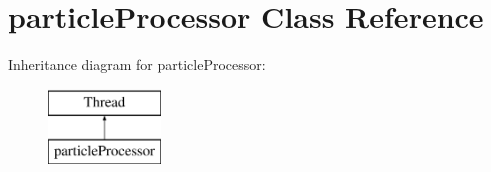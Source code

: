 \hypertarget{classparticleProcessor}{}\section{particle\+Processor Class Reference}
\label{classparticleProcessor}
Inheritance diagram for particle\+Processor\+:\begin{figure}[H]
\begin{center}
\leavevmode
\includegraphics[height=2.000000cm]{classparticleProcessor}
\end{center}
\end{figure}
